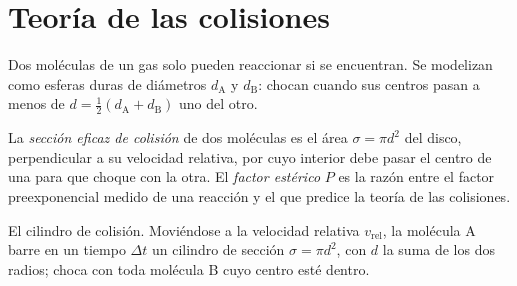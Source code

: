 \section{Teoría de las colisiones}

Dos moléculas de un gas solo pueden reaccionar si se encuentran. Se modelizan como esferas duras
de diámetros $d_{\mathrm A}$ y $d_{\mathrm B}$: chocan cuando sus centros pasan a menos de $d =
\frac12(d_{\mathrm A} + d_{\mathrm B})$ uno del otro.

\begin{definition}\label{def:b3:rate-theories:collision}
La \emph{sección eficaz de colisión} de dos moléculas
es el área $\sigma = \pi d^2$ del disco, perpendicular a su velocidad relativa,
por cuyo interior debe pasar el centro de una para que choque con la otra. El
\emph{factor estérico} $P$ es la razón entre el factor
preexponencial medido de una reacción y el que predice la teoría de las colisiones.
\end{definition}

\begin{omfigure}

{\small El cilindro de colisión. Moviéndose a la velocidad relativa $v_{\mathrm{rel}}$, la molécula A barre
en un tiempo $\Delta t$ un cilindro de sección $\sigma = \pi d^2$, con $d$ la suma de los dos
radios; choca con toda molécula B cuyo centro esté dentro.}
\end{omfigure}

